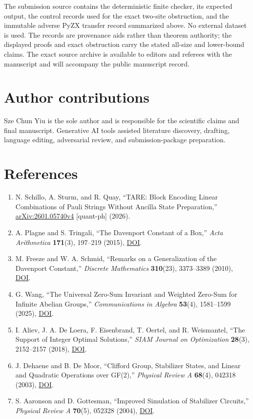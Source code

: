 \documentclass[11pt]{article}
\providecommand{\tightlist}{\setlength{\itemsep}{0pt}\setlength{\parskip}{0pt}}
\begin{document}
The submission source contains the deterministic finite checker, its expected output, the control records used for the exact two-site obstruction, and the immutable adverse PyZX transfer record summarized above. No external dataset is used. The records are provenance aids rather than theorem authority; the displayed proofs and exact obstruction carry the stated all-size and lower-bound claims. The exact source archive is available to editors and referees with the manuscript and will accompany the public manuscript record.

\hypertarget{author-contributions}{%
\section*{Author contributions}\label{author-contributions}}

Sze Chun Yiu is the sole author and is responsible for the scientific claims and final manuscript. Generative AI tools assisted literature discovery, drafting, language editing, adversarial review, and submission-package preparation.

\hypertarget{references}{%
\section*{References}\label{references}}

\begin{enumerate}
\def\labelenumi{\arabic{enumi}.}
\tightlist
\item
  N. Schillo, A. Sturm, and R. Quay, ``TARE: Block Encoding Linear Combinations of Pauli Strings Without Ancilla State Preparation,'' \href{https://arxiv.org/abs/2601.05740v4}{arXiv:2601.05740v4} {[}quant-ph{]} (2026).
\item
  A. Plagne and S. Tringali, ``The Davenport Constant of a Box,'' \emph{Acta Arithmetica} \textbf{171}(3), 197--219 (2015), \href{https://doi.org/10.4064/aa171-3-1}{DOI}.
\item
  M. Freeze and W. A. Schmid, ``Remarks on a Generalization of the Davenport Constant,'' \emph{Discrete Mathematics} \textbf{310}(23), 3373--3389 (2010), \href{https://doi.org/10.1016/j.disc.2010.07.028}{DOI}.
\item
  G. Wang, ``The Universal Zero-Sum Invariant and Weighted Zero-Sum for Infinite Abelian Groups,'' \emph{Communications in Algebra} \textbf{53}(4), 1581--1599 (2025), \href{https://doi.org/10.1080/00927872.2024.2418017}{DOI}.
\item
  I. Aliev, J. A. De Loera, F. Eisenbrand, T. Oertel, and R. Weismantel, ``The Support of Integer Optimal Solutions,'' \emph{SIAM Journal on Optimization} \textbf{28}(3), 2152--2157 (2018), \href{https://doi.org/10.1137/17M1162792}{DOI}.
\item
  J. Dehaene and B. De Moor, ``Clifford Group, Stabilizer States, and Linear and Quadratic Operations over GF(2),'' \emph{Physical Review A} \textbf{68}(4), 042318 (2003), \href{https://doi.org/10.1103/PhysRevA.68.042318}{DOI}.
\item
  S. Aaronson and D. Gottesman, ``Improved Simulation of Stabilizer Circuits,'' \emph{Physical Review A} \textbf{70}(5), 052328 (2004), \href{https://doi.org/10.1103/PhysRevA.70.052328}{DOI}.
\end{enumerate}
\end{document}
